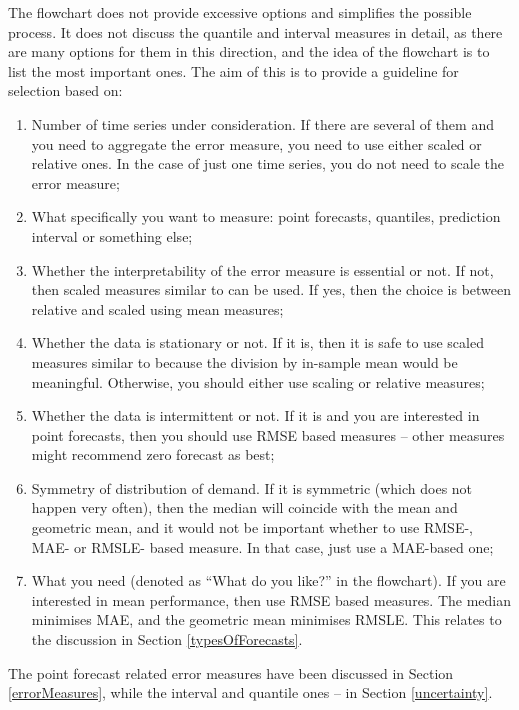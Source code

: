 \documentclass[]{book}
\providecommand{\tightlist}{%
  \setlength{\itemsep}{0pt}\setlength{\parskip}{0pt}}
\theoremstyle{definition}
\theoremstyle{definition}
\theoremstyle{definition}
\theoremstyle{definition}
\theoremstyle{remark}
\begin{document}
The flowchart does not provide excessive options and simplifies the possible process. It does not discuss the quantile and interval measures in detail, as there are many options for them in this direction, and the idea of the flowchart is to list the most important ones. The aim of this is to provide a guideline for selection based on:

\begin{enumerate}
\def\labelenumi{\arabic{enumi}.}
\tightlist
\item
  Number of time series under consideration. If there are several of them and you need to aggregate the error measure, you need to use either scaled or relative ones. In the case of just one time series, you do not need to scale the error measure;
\item
  What specifically you want to measure: point forecasts, quantiles, prediction interval or something else;
\item
  Whether the interpretability of the error measure is essential or not. If not, then scaled measures similar to \citet{Hyndman2006} can be used. If yes, then the choice is between relative and scaled using mean measures;
\item
  Whether the data is stationary or not. If it is, then it is safe to use scaled measures similar to \citet{Petropoulos2015} because the division by in-sample mean would be meaningful. Otherwise, you should either use \citet{Hyndman2006} scaling or relative measures;
\item
  Whether the data is intermittent or not. If it is and you are interested in point forecasts, then you should use RMSE based measures -- other measures might recommend zero forecast as best;
\item
  Symmetry of distribution of demand. If it is symmetric (which does not happen very often), then the median will coincide with the mean and geometric mean, and it would not be important whether to use RMSE-, MAE- or RMSLE- based measure. In that case, just use a MAE-based one;
\item
  What you need (denoted as ``What do you like?'' in the flowchart). If you are interested in mean performance, then use RMSE based measures. The median minimises MAE, and the geometric mean minimises RMSLE. This relates to the discussion in Section \ref{typesOfForecasts}.
\end{enumerate}

The point forecast related error measures have been discussed in Section \ref{errorMeasures}, while the interval and quantile ones -- in Section \ref{uncertainty}.
\end{document}
